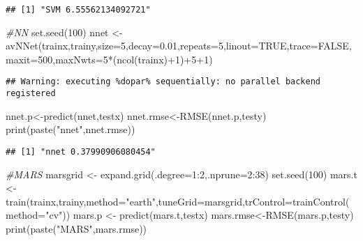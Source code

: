 \documentclass[
]{article}
\newenvironment{Shaded}{\begin{snugshade}}{\end{snugshade}}
\newcommand{\AttributeTok}[1]{\textcolor[rgb]{0.77,0.63,0.00}{#1}}
\newcommand{\CommentTok}[1]{\textcolor[rgb]{0.56,0.35,0.01}{\textit{#1}}}
\newcommand{\ConstantTok}[1]{\textcolor[rgb]{0.00,0.00,0.00}{#1}}
\newcommand{\DecValTok}[1]{\textcolor[rgb]{0.00,0.00,0.81}{#1}}
\newcommand{\FloatTok}[1]{\textcolor[rgb]{0.00,0.00,0.81}{#1}}
\newcommand{\FunctionTok}[1]{\textcolor[rgb]{0.00,0.00,0.00}{#1}}
\newcommand{\NormalTok}[1]{#1}
\newcommand{\OtherTok}[1]{\textcolor[rgb]{0.56,0.35,0.01}{#1}}
\newcommand{\SpecialCharTok}[1]{\textcolor[rgb]{0.00,0.00,0.00}{#1}}
\newcommand{\StringTok}[1]{\textcolor[rgb]{0.31,0.60,0.02}{#1}}
\begin{document}
\begin{verbatim}
## [1] "SVM 6.55562134092721"
\end{verbatim}

\begin{Shaded}
\begin{Highlighting}[]
\CommentTok{\#NN}
\FunctionTok{set.seed}\NormalTok{(}\DecValTok{100}\NormalTok{)}
\NormalTok{nnet }\OtherTok{\textless{}{-}} \FunctionTok{avNNet}\NormalTok{(trainx,trainy,}\AttributeTok{size=}\DecValTok{5}\NormalTok{,}\AttributeTok{decay=}\FloatTok{0.01}\NormalTok{,}\AttributeTok{repeats=}\DecValTok{5}\NormalTok{,}\AttributeTok{linout=}\ConstantTok{TRUE}\NormalTok{,}\AttributeTok{trace=}\ConstantTok{FALSE}\NormalTok{,}\AttributeTok{maxit=}\DecValTok{500}\NormalTok{,}\AttributeTok{maxNwts=}\DecValTok{5}\SpecialCharTok{*}\NormalTok{(}\FunctionTok{ncol}\NormalTok{(trainx)}\SpecialCharTok{+}\DecValTok{1}\NormalTok{)}\SpecialCharTok{+}\DecValTok{5}\SpecialCharTok{+}\DecValTok{1}\NormalTok{)}
\end{Highlighting}
\end{Shaded}

\begin{verbatim}
## Warning: executing %dopar% sequentially: no parallel backend registered
\end{verbatim}

\begin{Shaded}
\begin{Highlighting}[]
\NormalTok{nnet.p}\OtherTok{\textless{}{-}}\FunctionTok{predict}\NormalTok{(nnet,testx)}
\NormalTok{nnet.rmse}\OtherTok{\textless{}{-}}\FunctionTok{RMSE}\NormalTok{(nnet.p,testy)}
\FunctionTok{print}\NormalTok{(}\FunctionTok{paste}\NormalTok{(}\StringTok{"nnet"}\NormalTok{,nnet.rmse))}
\end{Highlighting}
\end{Shaded}

\begin{verbatim}
## [1] "nnet 0.37990906080454"
\end{verbatim}

\begin{Shaded}
\begin{Highlighting}[]
\CommentTok{\#MARS}
\NormalTok{marsgrid }\OtherTok{\textless{}{-}} \FunctionTok{expand.grid}\NormalTok{(}\AttributeTok{.degree=}\DecValTok{1}\SpecialCharTok{:}\DecValTok{2}\NormalTok{,}\AttributeTok{.nprune=}\DecValTok{2}\SpecialCharTok{:}\DecValTok{38}\NormalTok{)}
\FunctionTok{set.seed}\NormalTok{(}\DecValTok{100}\NormalTok{)}
\NormalTok{mars.t }\OtherTok{\textless{}{-}} \FunctionTok{train}\NormalTok{(trainx,trainy,}\AttributeTok{method=}\StringTok{"earth"}\NormalTok{,}\AttributeTok{tuneGrid=}\NormalTok{marsgrid,}\AttributeTok{trControl=}\FunctionTok{trainControl}\NormalTok{(}\AttributeTok{method=}\StringTok{"cv"}\NormalTok{))}
\NormalTok{mars.p }\OtherTok{\textless{}{-}} \FunctionTok{predict}\NormalTok{(mars.t,testx)}
\NormalTok{mars.rmse}\OtherTok{\textless{}{-}}\FunctionTok{RMSE}\NormalTok{(mars.p,testy)}
\FunctionTok{print}\NormalTok{(}\FunctionTok{paste}\NormalTok{(}\StringTok{"MARS"}\NormalTok{,mars.rmse))}
\end{Highlighting}
\end{Shaded}
\end{document}
